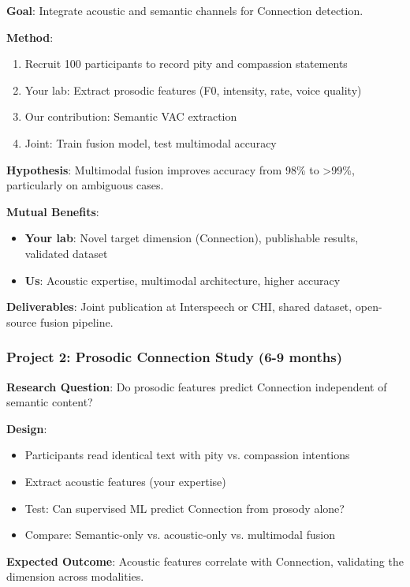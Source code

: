 \documentclass[11pt]{article}
\begin{document}
\textbf{Goal}: Integrate acoustic and semantic channels for Connection detection.

\textbf{Method}:
\begin{enumerate}
    \item Recruit 100 participants to record pity and compassion statements
    \item Your lab: Extract prosodic features (F0, intensity, rate, voice quality)
    \item Our contribution: Semantic VAC extraction
    \item Joint: Train fusion model, test multimodal accuracy
\end{enumerate}

\textbf{Hypothesis}: Multimodal fusion improves accuracy from 98\% to >99\%, particularly on ambiguous cases.

\textbf{Mutual Benefits}:
\begin{itemize}
    \item \textbf{Your lab}: Novel target dimension (Connection), publishable results, validated dataset
    \item \textbf{Us}: Acoustic expertise, multimodal architecture, higher accuracy
\end{itemize}

\textbf{Deliverables}: Joint publication at Interspeech or CHI, shared dataset, open-source fusion pipeline.

\subsubsection*{Project 2: Prosodic Connection Study (6-9 months)}

\textbf{Research Question}: Do prosodic features predict Connection independent of semantic content?

\textbf{Design}:
\begin{itemize}
    \item Participants read identical text with pity vs. compassion intentions
    \item Extract acoustic features (your expertise)
    \item Test: Can supervised ML predict Connection from prosody alone?
    \item Compare: Semantic-only vs. acoustic-only vs. multimodal fusion
\end{itemize}

\textbf{Expected Outcome}: Acoustic features correlate with Connection, validating the dimension across modalities.
\end{document}
